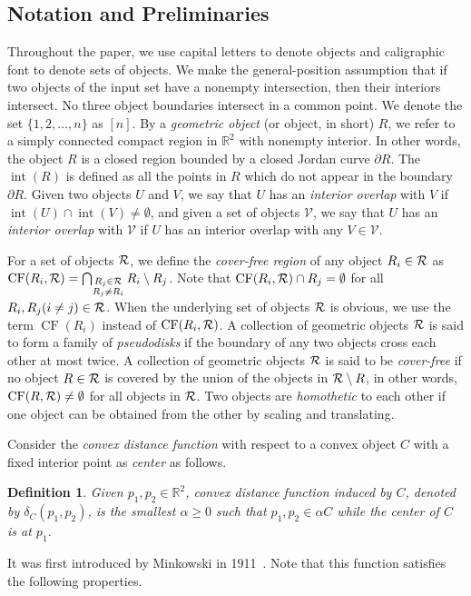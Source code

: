 \documentclass[a4paper,11pt]{article}
\newcommand{\IR}{\mathbb{R}}
\DeclareMathOperator{\interior}{int}
\DeclareMathOperator{\CF}{CF}
\newtheorem{definition}{Definition}
\begin{document}
\subsection{{Notation and Preliminaries}}
Throughout the paper, we use capital  {letters to denote objects} and
 caligraphic font to denote   {sets of objects}.  {We make the general-position assumption that if two objects of the input set have a nonempty intersection, then their interiors intersect. No three object boundaries intersect in a common point.}
We denote the set $\{1,2,\ldots, n\}$ as $[n]$.
By a \emph{geometric object} (or object, in short) $R$, 
we 
refer  to a simply connected compact region  in $\IR^2$ with nonempty interior. 
In other words, 
the object $R$ is a closed region bounded by a closed 
Jordan curve $\partial{R}$. The $\interior(R)$ is defined as all the 
points in $R$ which do not appear in the boundary  $\partial{R}$. 
Given two objects $U$ and $V$, we say that $U$ has an \emph{interior overlap} with $V$ if $\interior(U) \cap \interior(V) \neq \emptyset$, and given a set of objects $\mathcal{V}$, we say that $U$ has an \emph{interior overlap} with $\mathcal{V}$ if $U$ has an interior overlap with any $V \in \mathcal{V}$.
  


For a   set of objects $\cal R$,  we define the 
\emph{cover-free region} of any object $R_i\in {\cal R}$  as $\CF(R_i, {\cal R})=  \bigcap_{\substack{R_j\in {\cal R}\\ R_j \neq R_i}} R_i \setminus R_j$. Note that $\CF(R_i,{\cal R})\cap R_j=\emptyset$ for all 
$R_i,R_j(i\neq j)\in {\cal R}$. When the  {underlying} set of objects $\cal R$ is obvious, we use the term 
$\CF(R_i)$ 
instead of $\CF(R_i, {\cal R})$.
A collection of geometric objects $\cal R$
is said to form a family of \emph{pseudodisks} if the boundary of any two 
objects cross each other at most twice.  A collection of  geometric 
objects $\cal R$ is said to be \emph{cover-free}
 if no object $R\in {\cal R}$ is covered by the union of the objects in ${\cal 
R}\setminus R$, in other words, $\CF(R, {\cal R})\neq \emptyset$ for all  
objects in $\cal R$. 
  Two objects  are \emph{homothetic} to each other if one object can be 
obtained from the other by scaling and translating. 



 Consider the \emph{convex distance function} with respect to a convex object $C$ with a fixed interior point as \emph{center} as follows.

\begin{definition}\label{def_1_cd}
 Given $p_1, p_2 \in \mathbb{R}^2$, \emph{convex distance function} induced by $C$, denoted by $\delta_C(p_1,p_2)$, is the smallest $\alpha \geq 0$ such that $p_1, p_2 \in \alpha C$ while  the center of $C$ is at $p_1$. 
\end{definition}
 It was first introduced by Minkowski in 1911~\cite{KelleyN, ChewD85}. Note that this function satisfies the following  properties.
\end{document}
